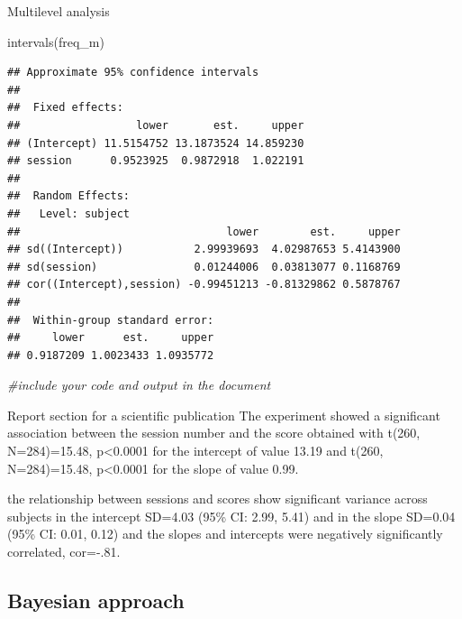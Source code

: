 \documentclass[
  ignorenonframetext,
]{beamer}
\newenvironment{Shaded}{\begin{snugshade}}{\end{snugshade}}
\newcommand{\CommentTok}[1]{\textcolor[rgb]{0.56,0.35,0.01}{\textit{#1}}}
\newcommand{\FunctionTok}[1]{\textcolor[rgb]{0.00,0.00,0.00}{#1}}
\newcommand{\NormalTok}[1]{#1}
\begin{document}
\begin{frame}[fragile]{Multilevel analysis}
\begin{Shaded}
\begin{Highlighting}[]
\FunctionTok{intervals}\NormalTok{(freq\_m)}
\end{Highlighting}
\end{Shaded}

\begin{verbatim}
## Approximate 95% confidence intervals
## 
##  Fixed effects:
##                  lower       est.     upper
## (Intercept) 11.5154752 13.1873524 14.859230
## session      0.9523925  0.9872918  1.022191
## 
##  Random Effects:
##   Level: subject 
##                                lower        est.     upper
## sd((Intercept))           2.99939693  4.02987653 5.4143900
## sd(session)               0.01244006  0.03813077 0.1168769
## cor((Intercept),session) -0.99451213 -0.81329862 0.5878767
## 
##  Within-group standard error:
##     lower      est.     upper 
## 0.9187209 1.0023433 1.0935772
\end{verbatim}

\begin{Shaded}
\begin{Highlighting}[]
\CommentTok{\#include your code and output in the document}
\end{Highlighting}
\end{Shaded}
\end{frame}

\begin{frame}{Report section for a scientific publication}
\protect\hypertarget{report-section-for-a-scientific-publication-2}{}
The experiment showed a significant association between the session
number and the score obtained with t(260, N=284)=15.48, p\textless0.0001
for the intercept of value 13.19 and t(260, N=284)=15.48,
p\textless0.0001 for the slope of value 0.99.

the relationship between sessions and scores show significant variance
across subjects in the intercept SD=4.03 (95\% CI: 2.99, 5.41) and in
the slope SD=0.04 (95\% CI: 0.01, 0.12) and the slopes and intercepts
were negatively significantly correlated, cor=-.81.
\end{frame}

\hypertarget{bayesian-approach-2}{%
\subsection{Bayesian approach}\label{bayesian-approach-2}}
\end{document}
